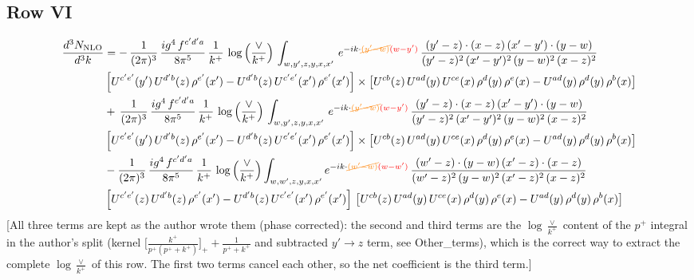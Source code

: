 \documentclass[9pt]{article}
\numberwithin{equation}{section}
\begin{document}
\subsection{Row VI}
\begin{align}
    \frac{d^{3}N_{\rm NLO}}{d^{3}k} & =    -\,\frac{1}{(2\pi)^{3}}\, \frac{ig^{4}\,f^{c'd'a}}{8\pi^{5}}\, \frac{1}{k^{+}}\,\log{\left(\frac{\vee}{k^{+}}\right)}\, \int_{w,y',z,y,x,x'}\, e^{-ik\cdot {\color{orange}\cancel{(y'-w)}}{\color{red}(w-y')}}\,\frac{(y'-z)\cdot (x-z)\,(x'-y')\cdot (y-w)}{(y'-z)^{2}\,(x'-y')^{2}\,(y-w)^{2}\,(x-z)^{2}}\notag \\ & \left[U^{c'e'}(y')\,U^{d'b}(z)\,\rho^{e'}(x')-U^{d'b}(z)\,U^{c'e'}(x')\,\rho^{e'}(x')\right]\times  \left[U^{cb}(z)\,U^{ad}(y)\,U^{ce}(x)\,\rho^{d}(y)\,\rho^{e}(x)-U^{ad}(y)\,\rho^{d}(y)\,\rho^{b}(x)\right] \notag \\
&   +\,\frac{1}{(2\pi)^{3}}\, \frac{ig^{4}\,f^{c'd'a}}{8\pi^{5}}\, \frac{1}{k^{+}}\,\log{\left(\frac{\vee}{k^{+}}\right)}\, \int_{w,y',z,y,x,x'}\, e^{-ik\cdot {\color{orange}\cancel{(y'-w)}}{\color{red}(w-y')}}\,\frac{(y'-z)\cdot (x-z)\,(x'-y')\cdot (y-w)}{(y'-z)^{2}\,(x'-y')^{2}\,(y-w)^{2}\,(x-z)^{2}}\notag \\ &   \left[U^{c'e'}(y')\,U^{d'b}(z)\,\rho^{e'}(x')-U^{d'b}(z)\,U^{c'e'}(x')\,\rho^{e'}(x')\right]\times  \left[U^{cb}(z)\,U^{ad}(y)\,U^{ce}(x)\,\rho^{d}(y)\,\rho^{e}(x)-U^{ad}(y)\,\rho^{d}(y)\,\rho^{b}(x)\right] \notag \\
&   -\frac{1}{(2\pi)^{3}}\, \frac{ig^{4}\,f^{c'd'a}}{8\pi^{5}}\, \frac{1}{k^{+}}\,\log{\left(\frac{\vee}{k^{+}}\right)}\int_{w,w',z,y,x,x'} e^{-ik\cdot {\color{orange}\cancel{(w'-w)}}{\color{red}(w-w')}}\,\frac{(w'-z)\cdot (y-w)\,(x'-z)\cdot (x-z)}{(w'-z)^{2}\,(y-w)^{2}\,(x'-z)^{2}\,(x-z)^{2}}\notag \\
&   \left[U^{c'e'}(z)\,U^{d'b}(z)\,\rho^{e'}(x')-U^{d'b}(z)\,U^{c'e'}(x')\,\rho^{e'}(x')\right]\,\left[U^{cb}(z)\,U^{ad}(y)\,U^{ce}(x)\,\rho^{d}(y)\,\rho^{e}(x)-U^{ad}(y)\,\rho^{d}(y)\,\rho^{b}(x)\right]
\end{align} {\color{red}[All three terms are kept as the author wrote them (phase corrected): the second and third terms are the $\log\frac{\vee}{k^{+}}$ content of the $p^{+}$ integral in the author's split (kernel $\big[\frac{k^{+}}{p^{+}(p^{+}+k^{+})}\big]_{+}+\frac{1}{p^{+}+k^{+}}$ and subtracted $y'\to z$ term, see Other\_terms), which is the correct way to extract the complete $\log\frac{\vee}{k^{+}}$ of this row. The first two terms cancel each other, so the net coefficient is the third term.]}\par\noindent
\end{document}
